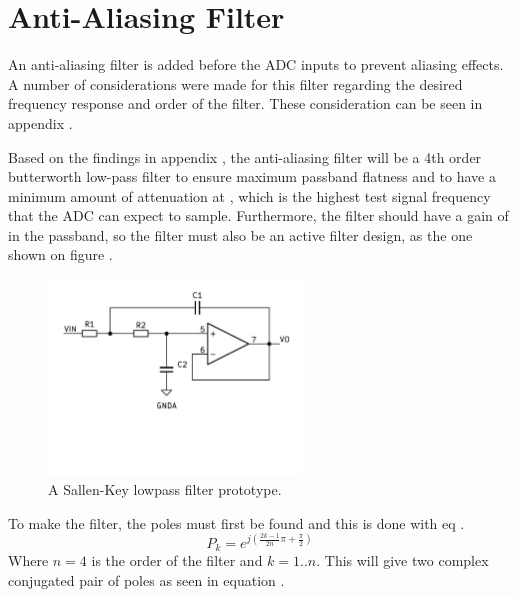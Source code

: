\section{Anti-Aliasing Filter} \label{subsec:AAFilter}

An anti-aliasing filter is added before the ADC inputs to prevent aliasing effects. A number of considerations were made for this filter regarding the desired frequency response and order of the filter. These consideration can be seen in appendix .

Based on the findings in appendix , the anti-aliasing filter will be a 4th order butterworth low-pass filter to ensure maximum passband flatness and to have a minimum amount of attenuation at , which is the highest test signal frequency that the ADC can expect to sample. Furthermore, the filter should have a gain of  in the passband, so the filter must also be an active filter design, as the one shown on figure .

\begin{figure}[H]
    \centering
    \includegraphics[clip, trim=0 150 0 0, width=0.6\textwidth]{Sections/7_SystemDesign/Figures/7_1_4_AAF_SALLENKEY.pdf}
    \caption{A Sallen-Key lowpass filter prototype.}
    \label{fig_7_1_4_SALLENKEY}
\end{figure}

To make the filter, the poles must first be found and this is done with eq \cite{ANALOGFILTERS}.
\begin{equation}\label{eq:7_1_4_LPPoles}
    P_k = e^{j(\frac{2k-1}{2n}\pi + \frac{\pi}{2}  )} 
\end{equation}
Where $n = 4$ is the order of the filter and $k = 1..n$. This will give two complex conjugated pair of poles as seen in equation .

